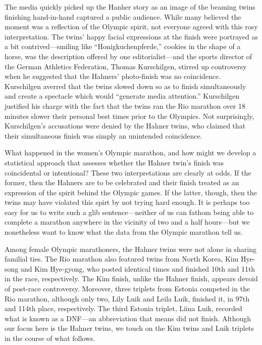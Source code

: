 \documentclass[12pt,titlepage]{article}
\begin{document}

The media quickly picked up the Hanher story as an image of the
beaming twins finishing hand-in-hand captured a public audience. While
many believed the moment was a reflection of the Olympic spirit, not
everyone agreed with this rosy interpretation. The twins' happy facial
expressions at the finish were portrayed as a bit contrived---smiling
like ``Honigkuchenpferde,'' cookies in the shape of a horse, was the
description offered by one editorialist---and the sports director of
the German Athletics Federation, Thomas Kurschilgen, stirred up
controversy when he suggested that the Hahners' photo-finish was no
coincidence.  Kurschilgen averred that the twins slowed down so as to
finish simultaneously and create a spectacle which would ``generate
media attention.''  Kurschilgen justified his charge with the fact
that the twins ran the Rio marathon over 18 minutes slower their
personal best times prior to the Olympics.  Not surprisingly,
Kurschilgen's accusations were denied by the Hahner twins, who claimed
that their simultaneous finish was simply an unintended coincidence.


What happened in the women's Olympic marathon, and how might we
develop a statistical approach that assesses whether the Hahner twin's
finish was coincidental or intentional?  These two interpretations are
clearly at odds. If the former, then the Hahners are to be celebrated
and their finish treated as an expression of the spirit behind the
Olympic games. If the latter, though, then the twins may have violated
this spirt by not trying hard enough. It is perhaps too easy for us to
write such a glib sentence---neither of us can fathom being able to
complete a marathon anywhere in the vicinity of two and a half
hours---but we nonetheless want to know what the data from the Olympic
marathon tell us.  


Among female Olympic marathoners, the Hahner twins were not alone in
sharing familial ties.  The Rio marathon also featured twins from
North Korea, Kim Hye-song and Kim Hye-gyong, who posted identical
times and finished 10th and 11th in the race, respectively. The Kim
finish, unlike the Hahner finish, appears devoid of post-race
controversy. Moreover, three triplets from Estonia competed in the Rio
marathon, although only two, Lily Luik and Leila Luik, finished it, in
97th and 114th place, respectively. The third Estonia triplet, Liina
Luik, recorded what is known as a DNF---an abbreviation that means did
not finish.  Although our focus here is the Hahner twins, we touch on
the Kim twins and Luik triplets in the course of what follows.
\end{document}
